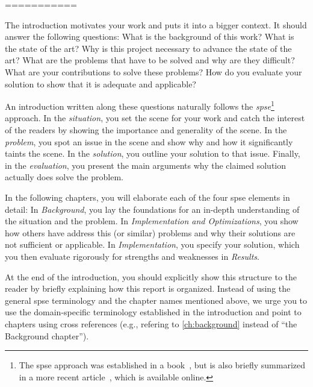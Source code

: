 ===========


The introduction motivates your work and puts it into a bigger context.
It should answer the following questions:
What is the background of this work?
What is the state of the art?
Why is this project necessary to advance the state of the art?
What are the problems that have to be solved and why are they difficult?
What are your contributions to solve these problems?
How do you evaluate your solution to show that it is adequate and applicable?

An introduction written along these questions naturally follows the \textit{\gls{spse}}\footnote{%
  The \acrshort{spse} approach was established in a book~\cite{Hoey83}, but is also briefly summarized in a more recent article~\cite{MP12}, which is available online.
} approach.
In the \emph{situation}, you set the scene for your work and catch the interest of the readers by showing the importance and generality of the scene.
In the \emph{problem}, you spot an issue in the scene and show why and how it significantly taints the scene.
In the \emph{solution}, you outline your solution to that issue.
Finally, in the \emph{evaluation}, you present the main arguments why the claimed solution actually does solve the problem.

In the following chapters, you will elaborate each of the four \gls{spse} elements in detail:
In \textsl{Background}, you lay the foundations for an in-depth understanding of the situation and the problem.
In \textsl{Implementation and Optimizations}, you show how others have address this (or similar) problems and why their solutions are not sufficient or applicable.
In \textsl{Implementation}, you specify your solution, which you then evaluate rigorously for strengths and weaknesses in \textsl{Results}.

At the end of the introduction, you should explicitly show this structure to the reader by briefly explaining how this report is organized.
Instead of using the general \gls{spse} terminology and the chapter names mentioned above, we urge you to use the domain-specific terminology established in the introduction and point to chapters using cross references (e.g., refering to \cref{ch:background} instead of ``the Background chapter'').
